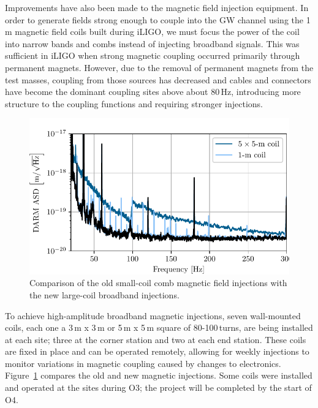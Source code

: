 Improvements have also been made to the magnetic field injection equipment. In order to generate fields strong enough to couple into the \ac{GW} channel using the 1\,m magnetic field coils built during \ac{iLIGO}, we must focus the power of the coil into narrow bands and combs instead of injecting broadband signals. This was sufficient in \ac{iLIGO} when strong magnetic coupling occurred primarily through permanent magnets. However, due to the removal of permanent magnets from the test masses, coupling from those sources has decreased and cables and connectors have become the dominant coupling sites above about 80\,Hz, introducing more structure to the coupling functions and requiring stronger injections.

\begin{figure}[h!]
	\centering
	\includegraphics{figures/injection-wallcoil.pdf}
	\caption{
		Comparison of the old small-coil comb magnetic field injections with the new large-coil broadband injections.}
	\label{fig:injection-wallcoil}
\end{figure}

To achieve high-amplitude broadband magnetic injections, seven wall-mounted coils, each one a 3\,m x 3\,m or 5\,m x 5\,m square of 80-100\,turns, are being installed at each site; three at the corner station and two at each end station. These coils are fixed in place and can be operated remotely, allowing for weekly injections to monitor variations in magnetic coupling caused by changes to electronics. Figure~\ref{fig:injection-wallcoil} compares the old and new magnetic injections. Some coils were installed and operated at the sites during O3; the project will be completed by the start of O4.







